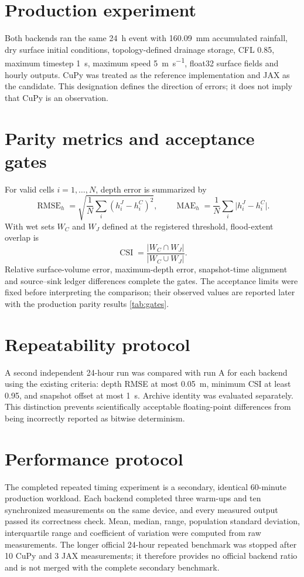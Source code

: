 \documentclass[11pt,a4paper,oneside]{report}
\begin{document}
\section{Production experiment}
Both backends ran the same \SI{24}{\hour} event with \SI{160.09}{\milli\metre} accumulated
rainfall, dry surface initial conditions, topology-defined drainage storage, CFL 0.85,
maximum timestep \SI{1}{\second}, maximum speed \SI{5}{\metre\per\second}, float32 surface
fields and hourly outputs. CuPy was treated as the reference implementation and JAX as the
candidate. This designation defines the direction of errors; it does not imply that CuPy is
an observation.

\section{Parity metrics and acceptance gates}
For valid cells $i=1,\dots,N$, depth error is summarized by
\begin{equation}
 \operatorname{RMSE}_h=\sqrt{\frac1N\sum_i(h_i^{J}-h_i^{C})^2},\qquad
 \operatorname{MAE}_h=\frac1N\sum_i\lvert h_i^{J}-h_i^{C}\rvert.
\end{equation}
With wet sets $W_C$ and $W_J$ defined at the registered threshold, flood-extent overlap is
\begin{equation}
 \operatorname{CSI}=\frac{\lvert W_C\cap W_J\rvert}
 {\lvert W_C\cup W_J\rvert}.
\end{equation}
Relative surface-volume error, maximum-depth error, snapshot-time alignment and source--sink
ledger differences complete the gates. The acceptance limits were fixed before interpreting the comparison; their observed values are reported later with the production parity results \cref{tab:gates}.

\section{Repeatability protocol}
A second independent 24-hour run was compared with run A for each backend using the existing
criteria: depth RMSE at most \SI{0.05}{\metre}, minimum CSI at least 0.95, and snapshot
offset at most \SI{1}{\second}. Archive identity was evaluated separately. This distinction
prevents scientifically acceptable floating-point differences from being incorrectly
reported as bitwise determinism.

\section{Performance protocol}
The completed repeated timing experiment is a secondary, identical 60-minute production
workload. Each backend completed three warm-ups and ten synchronized measurements on the
same device, and every measured output passed its correctness check. Mean, median, range,
population standard deviation, interquartile range and coefficient of variation were
computed from raw measurements. The longer official 24-hour repeated benchmark was stopped
after 10 CuPy and 3 JAX measurements; it therefore provides no official backend ratio and is
not merged with the complete secondary benchmark.
\end{document}
